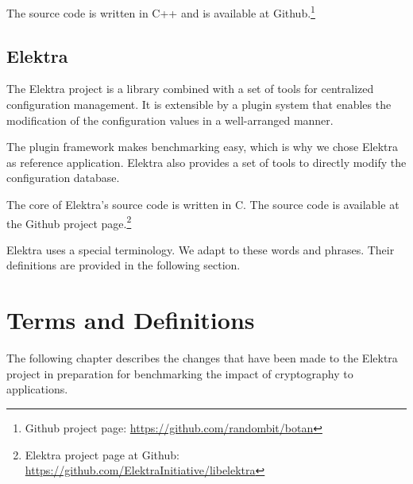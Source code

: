 The source code is written in C++ and is available at Github.\footnote{Github project page: \url{https://github.com/randombit/botan}}

	\subsection{Elektra}

The Elektra project is a library combined with a set of tools for centralized configuration management.
It is extensible by a plugin system that enables the modification of the configuration values in a well-arranged manner.\cite{raab2010thesis}

The plugin framework makes benchmarking easy, which is why we chose Elektra as reference application.
Elektra also provides a set of tools to directly modify the configuration database.

The core of Elektra's source code is written in C.
The source code is available at the Github project page.\footnote{Elektra project page at Github: \url{https://github.com/ElektraInitiative/libelektra}}

Elektra uses a special terminology.
We adapt to these words and phrases.
Their definitions are provided in the following section.

\section{Terms and Definitions}

The following chapter describes the changes that have been made to the Elektra project in preparation for benchmarking the impact of cryptography to applications.
